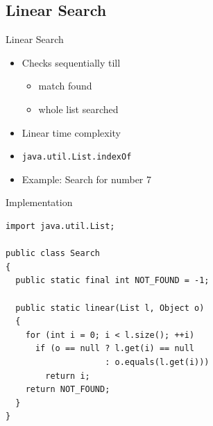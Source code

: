 \documentclass[pdf]{beamer}
\begin{document}
\subsection{Linear Search}
\begin{frame}[fragile]{Linear Search}\Large
  \begin{itemize}
    \item Checks sequentially till
      \begin{itemize}\Large
        \item match found
        \item whole list searched
      \end{itemize}
    \item Linear time complexity
    \item \verb|java.util.List.indexOf|
    \item Example: Search for number 7
      \begin{center}
      \end{center}
  \end{itemize}
\end{frame}

\begin{frame}[fragile]{Implementation}
\begin{verbatim}
import java.util.List;

public class Search
{
  public static final int NOT_FOUND = -1;

  public static linear(List l, Object o)
  {
    for (int i = 0; i < l.size(); ++i)
      if (o == null ? l.get(i) == null
                    : o.equals(l.get(i)))
        return i;
    return NOT_FOUND;
  }
}
\end{verbatim}
\end{frame}
\end{document}
